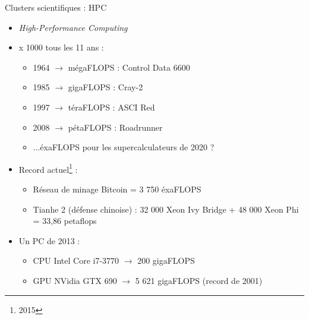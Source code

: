 \begin{frame}{Clusters scientifiques : HPC}
\begin{itemize}
\item \textit{High-Performance Computing}
\item <2->x 1000 tous les 11 ans :
\begin{itemize}
\item 1964 $\rightarrow$ mégaFLOPS : Control Data 6600
\item 1985 $\rightarrow$ gigaFLOPS : Cray-2
\item 1997 $\rightarrow$ téraFLOPS : ASCI Red
\item 2008 $\rightarrow$ pétaFLOPS : Roadrunner
\item ...éxaFLOPS pour les supercalculateurs de 2020 ?
\end{itemize}
\item <3->Record actuel\footnote{2015} : 
\begin{itemize}
\item Réseau de minage Bitcoin = 3 750 éxaFLOPS
\item Tianhe 2 (défense chinoise) : 32 000 Xeon Ivy Bridge + 48 000 Xeon Phi = 33,86 petaflops
\end{itemize}

\item <4->Un PC de 2013 :
\begin{itemize}
\item CPU Intel Core i7-3770 $\rightarrow$ 200 gigaFLOPS
\item GPU NVidia GTX 690 $\rightarrow$ 5 621 gigaFLOPS (record de 2001)
\end{itemize}
\end{itemize}
\end{frame}


